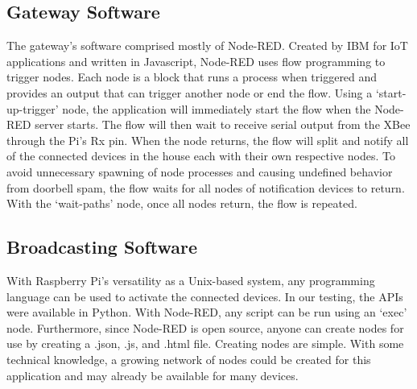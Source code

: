\subsection{Gateway Software}
The gateway’s software comprised mostly of Node-RED. Created by IBM for IoT applications and written in Javascript, Node-RED uses flow programming to trigger nodes. Each node is a block that runs a process when triggered and provides an output that can trigger another node or end the flow. Using a ‘start-up-trigger’ node, the application will immediately start the flow when the Node-RED server starts. The flow will then wait to receive serial output from the XBee through the Pi’s Rx pin. When the node returns, the flow will split and notify all of the connected devices in the house each with their own respective nodes. To avoid unnecessary spawning of node processes and causing undefined behavior from doorbell spam, the flow waits for all nodes of notification devices to return. With the ‘wait-paths’ node, once all nodes return, the flow is repeated.

\subsection{Broadcasting Software}
With Raspberry Pi’s versatility as a Unix-based system, any programming language can be used to activate the connected devices. In our testing, the APIs were available in Python. With Node-RED, any script can be run using an ‘exec’ node. Furthermore, since Node-RED is open source, anyone can create nodes for use by creating a .json, .js, and .html file. Creating nodes are simple. With some technical knowledge, a growing network of nodes could be created for this application and may already be available for many devices.